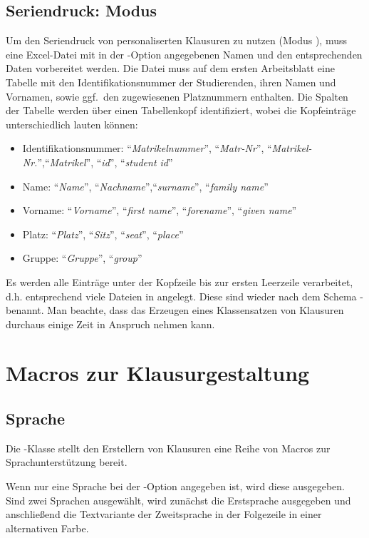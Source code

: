 \documentclass[
load=osgexam,
babel=ngerman
]{skdoc}
\begin{document}
\subsection{Seriendruck: Modus }
\label{sec:series} 
Um den Seriendruck von personaliserten Klausuren zu nutzen (Modus ), muss eine Excel-Datei mit in der
-Option angegebenen Namen und den entsprechenden Daten vorbereitet werden.
 Die Datei muss auf dem ersten Arbeitsblatt eine Tabelle mit den Identifikationsnummer der
Studierenden, ihren Namen und Vornamen, sowie ggf.\ den zugewiesenen Platznummern enthalten. Die Spalten der Tabelle
werden über einen Tabellenkopf identifiziert, wobei die Kopfeinträge unterschiedlich lauten können:
\begin{itemize}[nosep]
  \item Identifikationsnummer: ``\emph{Matrikelnummer}'', ``\emph{Matr-Nr}'', ``\emph{Matrikel-Nr.}'',``\emph{Matrikel}'', ``\emph{id}'', ``\emph{student id}''
  \item Name: ``\emph{Name}'', ``\emph{Nachname}'',``\emph{surname}'', ``\emph{family name}''
  \item Vorname: ``\emph{Vorname}'', ``\emph{first name}'', ``\emph{forename}'', ``\emph{given name}''
  \item Platz: ``\emph{Platz}'', ``\emph{Sitz}'', ``\emph{seat}'', ``\emph{place}''
  \item Gruppe: ``\emph{Gruppe}'', ``\emph{group}''
\end{itemize}
Es werden alle Einträge unter der Kopfzeile bis zur ersten Leerzeile verarbeitet, d.\;h. entsprechend viele Dateien in
 angelegt. Diese sind wieder nach dem Schema - benannt.
Man beachte, dass das Erzeugen eines Klassensatzen von Klausuren durchaus einige Zeit in Anspruch nehmen kann.

\section{Macros zur Klausurgestaltung}
\subsection{Sprache}
\label{sec:macro:lang}
Die \thepkg-Klasse stellt den Erstellern von Klausuren eine Reihe von Macros zur Sprachunterstützung bereit.

\DescribeMacro{} Wenn nur eine Sprache bei der
-Option angegeben ist, wird diese ausgegeben. Sind zwei Sprachen ausgewählt, wird zunächst die Erstsprache
ausgegeben und anschließend die Textvariante der Zweitsprache in der Folgezeile in einer alternativen Farbe.
\medskip
\end{document}
